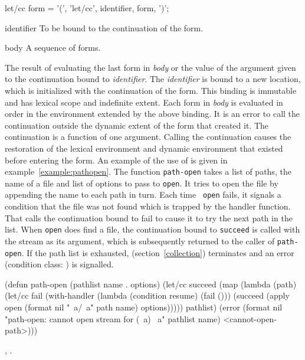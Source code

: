 \begin{optDefinition}

%
\Syntax
\savesyntax{}\vbox{\small\syntax
let/cc form
   = '(', 'let/cc', identifier, {form}, ')';
\endsyntax}
%
\begin{arguments}
    \item[identifier] To be bound to the continuation of the 
    form.
    \item[body] A sequence of forms.
\end{arguments}
%
\result%
The result of evaluating the last form in {\em body} or the value of
the argument given to the continuation bound to {\em identifier}.
%
\remarks%
The {\em identifier} is bound to a new location, which is initialized with the
continuation of the  form.  This binding is immutable and has
lexical scope and indefinite extent.  Each form in {\em body} is evaluated in order
in the environment extended by the above binding.  It is an error to call the
continuation outside the dynamic extent of the  form that
created it.  The continuation is a function of one argument.  Calling the
continuation causes the restoration of the lexical environment and dynamic
environment that existed before entering the  form.
%
\examples%
An example of the use of  is given in
example~\ref{example:pathopen}.  The function {\tt path-open} takes a list of
paths, the name of a file and list of options to pass to {\tt open}.  It tries
to open the file by appending the name to each path in turn.  Each time {\tt
    open} fails, it signals a condition that the file was not found which is
trapped by the handler function.  That calls the continuation bound to fail to
cause it to try the next path in the list.  When {\tt open} does find a file,
the continuation bound to {\tt succeed} is called with the stream as its
argument, which is subsequently returned to the caller of {\tt path-open}.  If
the path list is exhausted,  (section~\ref{collection})
terminates and an error (condition class: ) is
signalled.
%
\begin{example}
    \label{example:pathopen}
    {\small\syntax
    (defun path-open (pathlist name . options)
      (let/cc succeed
        (map
          (lambda (path)
            (let/cc fail
              (with-handler
                (lambda (condition resume) (fail ()))
                (succeed (apply open
                           (format nil "~a/~a" path name)
                           options)))))
          pathlist)
        (error
          (format nil
            "path-open: cannot open stream for (~a) ~a"
            pathlist name)
          <cannot-open-path>)))
    \endsyntax}
\end{example}
%
\seealso%
, .


\end{optDefinition}
